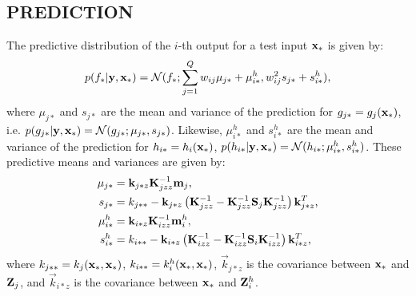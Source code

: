 \subsection{PREDICTION}
The predictive distribution of the $i$-th output for a test input $\mathbf{x}_*$ is given by:
\begin{align}
p(f_* | \mathbf{y}, \mathbf{x}_*) = \mathcal{N}(f_*; \sum_{j=1}^Q w_{ij} \mu_{j*} + \mu^h_{i*}, w_{ij}^2 s_{j*} + s^h_{i*}), 
\end{align}
where $\mu_{j*}$ and $s_{j*}$ are the mean and variance of the prediction for $g_{j*} = g_j(\mathbf{x}_*)$, i.e. $p(g_{j*} | \mathbf{y}, \mathbf{x}_*) = \mathcal{N}(g_{j*}; \mu_{j*}, s_{j*})$.
Likewise, $\mu^h_{i*}$ and $s^h_{i*}$ are the mean and variance of the prediction for $h_{i*} = h_i(\mathbf{x}_*)$, $p(h_{i*} | \mathbf{y}, \mathbf{x}_*) = \mathcal{N}(h_{i*}; \mu^h_{i*}, s^h_{i*})$.
These predictive means and variances are given by: 
\begin{align}
\mu_{j*} &= \mathbf{k}_{j*z} \mathbf{K}_{jzz}^{-1} \mathbf{m}_j  \text{,}\\ 
s_{j*} &= k_{j**} - \mathbf{k}_{j*z} \left(\mathbf{K}_{jzz}^{-1} - \mathbf{K}_{jzz}^{-1} \mathbf{S}_j \mathbf{K}_{jzz}^{-1} \right) \mathbf{k}_{j*z}^T  \text{,}\\
\mu^h_{i*} &= \mathbf{k}_{i*z} \mathbf{K}_{izz}^{-1} \mathbf{m}^h_i \text{,} \\
s^h_{i*} &= k_{i**} - \mathbf{k}_{i*z} \left(\mathbf{K}_{izz}^{-1} - \mathbf{K}_{izz}^{-1} \mathbf{S}_i \mathbf{K}_{izz}^{-1} \right) \mathbf{k}_{i*z}^T \text{,}
\end{align}
where $k_{j**} = k_j(\mathbf{x}_*, \mathbf{x}_*)$, $k_{i**} = k^h_i(\mathbf{x}_*, \mathbf{x}_*)$,  $\vec{k}_{j*z}$ is the covariance between $\mathbf{x}_*$ and $\mathbf{Z}_j$, and $\vec{k}_{i*z}$ is the covariance between $\mathbf{x}_*$ and $\mathbf{Z}^h_i$.

 

